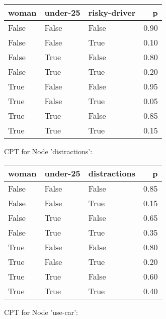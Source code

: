 \begin{tabular}{lllr}
\toprule
 woman &  under-25 &  risky-driver &    p \\
\midrule
 False &     False &         False & 0.90 \\
 False &     False &          True & 0.10 \\
 False &      True &         False & 0.80 \\
 False &      True &          True & 0.20 \\
  True &     False &         False & 0.95 \\
  True &     False &          True & 0.05 \\
  True &      True &         False & 0.85 \\
  True &      True &          True & 0.15 \\
\bottomrule
\end{tabular}


CPT for Node 'distractions':

\begin{tabular}{lllr}
\toprule
 woman &  under-25 &  distractions &    p \\
\midrule
 False &     False &         False & 0.85 \\
 False &     False &          True & 0.15 \\
 False &      True &         False & 0.65 \\
 False &      True &          True & 0.35 \\
  True &     False &         False & 0.80 \\
  True &     False &          True & 0.20 \\
  True &      True &         False & 0.60 \\
  True &      True &          True & 0.40 \\
\bottomrule
\end{tabular}


CPT for Node 'use-car':

